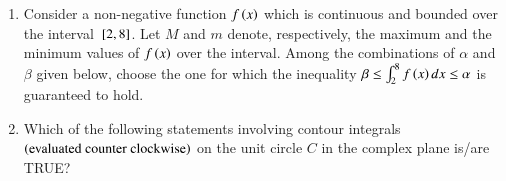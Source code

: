 \documentclass[journal,12pt,onecolumn]{IEEEtran}
\theoremstyle{remark}
\begin{document}
\begin{enumerate}
\hfill{}

\begin{enumerate}
\end{enumerate}

\item Consider a non-negative function $f\left(x\right)$ which is continuous and bounded over the interval ${}\left[2, 8\right]$. Let $M$ and $m$ denote, respectively, the maximum and the minimum values of $f\left(x\right)$ over the interval. Among the combinations of $\alpha$ and $\beta$ given below, choose the one for which the inequality $\beta \le \int_2^8 f\left(x\right) dx \le \alpha$ is guaranteed to hold.

\hfill{}

\begin{enumerate}
\end{enumerate}

\item Which of the following statements involving contour integrals $\left(\text{evaluated counter clockwise}\right)$ on the unit circle $C$ in the complex plane is/are TRUE?

\hfill{}

\begin{enumerate}
\end{enumerate}


\end{enumerate}
\end{document}
